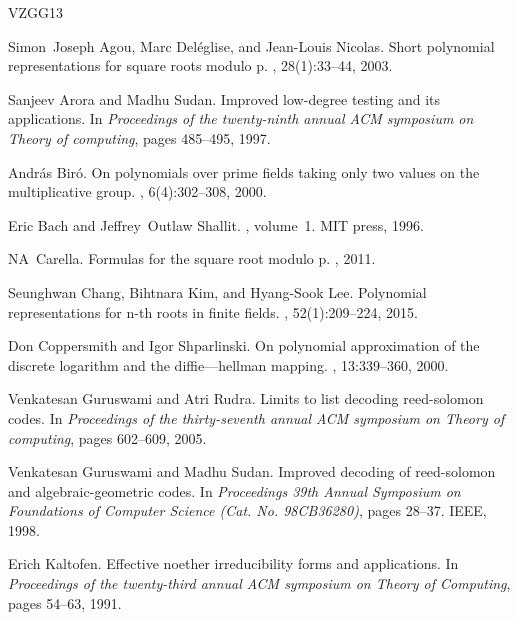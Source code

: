 \documentclass[10pt,a4paper]{article}
\begin{document}
\begin{thebibliography}{VZGG13}

Simon~Joseph Agou, Marc Del{\'e}glise, and Jean-Louis Nicolas.
\newblock Short polynomial representations for square roots modulo p.
, 28(1):33--44, 2003.

Sanjeev Arora and Madhu Sudan.
\newblock Improved low-degree testing and its applications.
\newblock In {\em Proceedings of the twenty-ninth annual ACM symposium on
  Theory of computing}, pages 485--495, 1997.

Andr{\'a}s Bir{\'o}.
\newblock On polynomials over prime fields taking only two values on the
  multiplicative group.
, 6(4):302--308, 2000.

Eric Bach and Jeffrey~Outlaw Shallit.
, volume~1.
\newblock MIT press, 1996.

NA~Carella.
\newblock Formulas for the square root modulo p.
, 2011.

Seunghwan Chang, Bihtnara Kim, and Hyang-Sook Lee.
\newblock Polynomial representations for n-th roots in finite fields.
, 52(1):209--224,
  2015.

Don Coppersmith and Igor Shparlinski.
\newblock On polynomial approximation of the discrete logarithm and the
  diffie—hellman mapping.
, 13:339--360, 2000.

Venkatesan Guruswami and Atri Rudra.
\newblock Limits to list decoding reed-solomon codes.
\newblock In {\em Proceedings of the thirty-seventh annual ACM symposium on
  Theory of computing}, pages 602--609, 2005.

Venkatesan Guruswami and Madhu Sudan.
\newblock Improved decoding of reed-solomon and algebraic-geometric codes.
\newblock In {\em Proceedings 39th Annual Symposium on Foundations of Computer
  Science (Cat. No. 98CB36280)}, pages 28--37. IEEE, 1998.

Erich Kaltofen.
\newblock Effective noether irreducibility forms and applications.
\newblock In {\em Proceedings of the twenty-third annual ACM symposium on
  Theory of Computing}, pages 54--63, 1991.


\end{thebibliography}
\end{document}
